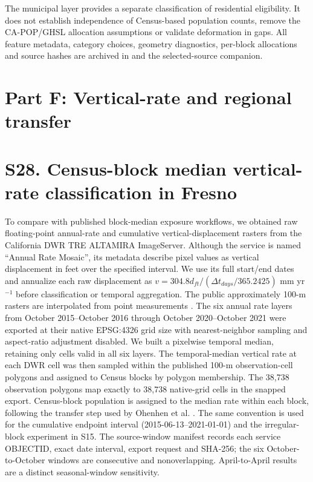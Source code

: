 \documentclass[10pt,a4paper]{article}
\begin{document}
The municipal layer provides a separate classification of residential eligibility. It does not establish independence of Census-based population counts, remove the CA-POP/GHSL allocation assumptions or validate deformation in gaps. All feature metadata, category choices, geometry diagnostics, per-block allocations and source hashes are archived in  and the selected-source companion.




\section*{Part F: Vertical-rate and regional transfer}
\section*{S28. Census-block median vertical-rate classification in Fresno}

To compare with published block-median exposure workflows, we obtained raw floating-point annual-rate and cumulative vertical-displacement rasters from the California DWR TRE ALTAMIRA ImageServer. Although the service is named ``Annual Rate Mosaic'', its metadata describe pixel values as vertical displacement in feet over the specified interval. We use its full start/end dates and annualize each raw displacement as $v=304.8d_{ft}/(\Delta t_{days}/365.2425)$ mm yr$^{-1}$ before classification or temporal aggregation. The public approximately 100-m rasters are interpolated from point measurements \citep{dwr2026,dwrdocumentation}. The six annual rate layers from October 2015--October 2016 through October 2020--October 2021 were exported at their native EPSG:4326 grid size with nearest-neighbor sampling and aspect-ratio adjustment disabled. We built a pixelwise temporal median, retaining only cells valid in all six layers. The temporal-median vertical rate at each DWR cell was then sampled within the published 100-m observation-cell polygons and assigned to Census blocks by polygon membership. The 38,738 observation polygons map exactly to 38,738 native-grid cells in the snapped export. Census-block population is assigned to the median rate within each block, following the transfer step used by Ohenhen et al. \citep{ohenhen2025uscities}. The same convention is used for the cumulative endpoint interval (2015-06-13--2021-01-01) and the irregular-block experiment in S15. The source-window manifest records each service OBJECTID, exact date interval, export request and SHA-256; the six October-to-October windows are consecutive and nonoverlapping. April-to-April results are a distinct seasonal-window sensitivity.
\end{document}
